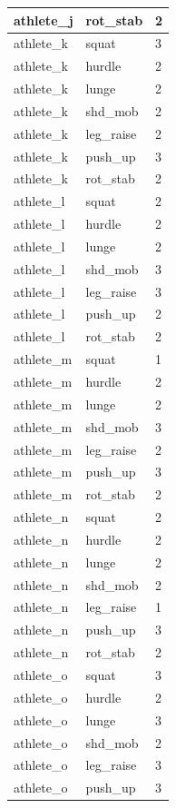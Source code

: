 \documentclass[
]{book}
\begin{document}
\begin{tabular}{l|l|l}
\hline
athlete\_j & rot\_stab & 2\\
\hline
athlete\_k & squat & 3\\
\hline
athlete\_k & hurdle & 2\\
\hline
athlete\_k & lunge & 2\\
\hline
athlete\_k & shd\_mob & 2\\
\hline
athlete\_k & leg\_raise & 2\\
\hline
athlete\_k & push\_up & 3\\
\hline
athlete\_k & rot\_stab & 2\\
\hline
athlete\_l & squat & 2\\
\hline
athlete\_l & hurdle & 2\\
\hline
athlete\_l & lunge & 2\\
\hline
athlete\_l & shd\_mob & 3\\
\hline
athlete\_l & leg\_raise & 3\\
\hline
athlete\_l & push\_up & 2\\
\hline
athlete\_l & rot\_stab & 2\\
\hline
athlete\_m & squat & 1\\
\hline
athlete\_m & hurdle & 2\\
\hline
athlete\_m & lunge & 2\\
\hline
athlete\_m & shd\_mob & 3\\
\hline
athlete\_m & leg\_raise & 2\\
\hline
athlete\_m & push\_up & 3\\
\hline
athlete\_m & rot\_stab & 2\\
\hline
athlete\_n & squat & 2\\
\hline
athlete\_n & hurdle & 2\\
\hline
athlete\_n & lunge & 2\\
\hline
athlete\_n & shd\_mob & 2\\
\hline
athlete\_n & leg\_raise & 1\\
\hline
athlete\_n & push\_up & 3\\
\hline
athlete\_n & rot\_stab & 2\\
\hline
athlete\_o & squat & 3\\
\hline
athlete\_o & hurdle & 2\\
\hline
athlete\_o & lunge & 3\\
\hline
athlete\_o & shd\_mob & 2\\
\hline
athlete\_o & leg\_raise & 3\\
\hline
athlete\_o & push\_up & 3\\

\end{tabular}
\end{document}
